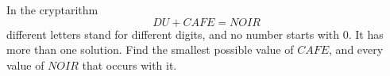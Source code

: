 In the cryptarithm
\[
DU+CAFE=NOIR
\]
different letters stand for different digits, and no number starts with $0$. It has more than one solution. Find the smallest possible value of $CAFE$, and every value of $NOIR$ that occurs with it.
